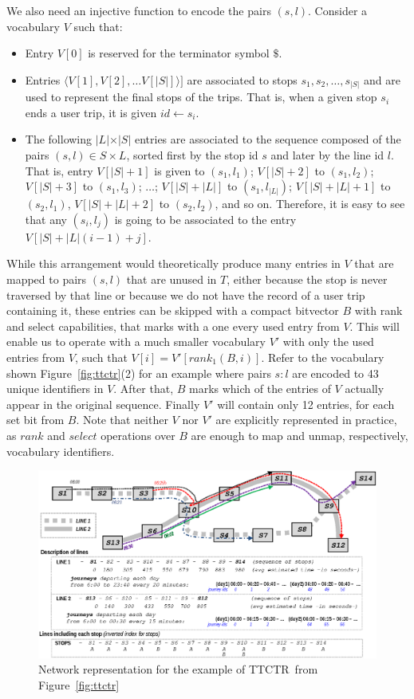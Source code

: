 \documentclass[runningheads]{llncs}
\newcommand{\ttctr}{TTCTR}
\begin{document}
We also need an injective function to encode the pairs $(s,l)$. Consider a vocabulary $V$ such that:
\begin{itemize}
	\item Entry $V[0]$ is reserved for the terminator symbol $\$$.
	\item Entries $\langle V[1],V[2], \dots V[|S|]\rangle]$ are associated to stops $s_1,s_2,\dots, s_{|S|}$ and are used to represent the final stops of the trips. That is, when a given stop $s_i$ ends a user trip, it is given $id \leftarrow s_i$.
	\item The following $|L|$$\times$$|S|$ entries are associated to the sequence composed of the pairs $(s,l) \in S\times L$, sorted first by the stop id $s$ and later by the line id $l$. That is, entry $V[|S|+1]$ is given to $(s_1,l_1)$; $V[|S|+2]$ to $(s_1,l_2)$; $V[|S|+3]$ to $(s_1,l_3)$; $\dots$; $V[|S|+|L|]$ to $(s_1,l_{|L|})$;  $V[|S|+|L|+1]$ to $(s_2, l_1)$, $V[|S|+|L|+2]$ to $(s_2, l_2)$, and so on. Therefore, it is easy to see that any $(s_i,l_j)$ is going to be associated to the entry $V[|S|+ |L|(i-1) + j]$.
\end{itemize}

While this arrangement would theoretically produce many entries in $V$ that are mapped to pairs $(s,l)$ that are unused in $T$, either because the stop is never traversed by that line or because we do not have the record of a user trip containing it, these entries can be skipped with a compact bitvector $B$ with rank and select capabilities, that marks with a one every used entry from $V$. This will enable us to operate with a much smaller vocabulary $V'$ with only the used entries from $V$, such that $V[i] = V'[rank_1(B,i)]$. Refer to the vocabulary shown Figure~\ref{fig:ttctr}(2) for an example where pairs $s:l$ are encoded to 43 unique identifiers in $V$. After that, $B$ marks which of the entries of $V$ actually appear in the original sequence. Finally $V'$ will contain only 12 entries, for each set bit from $B$. Note that neither $V$ nor $V'$ are explicitly represented in practice, as $rank$ and $select$ operations over $B$ are enough to map and unmap, respectively, vocabulary identifiers.

\begin{figure}
\includegraphics[width=\textwidth]{network.eps}
\caption{Network representation for the example of \ttctr~from Figure~\ref{fig:ttctr}}
\label{fig:example_trips_ttctr}
\end{figure}
\end{document}
